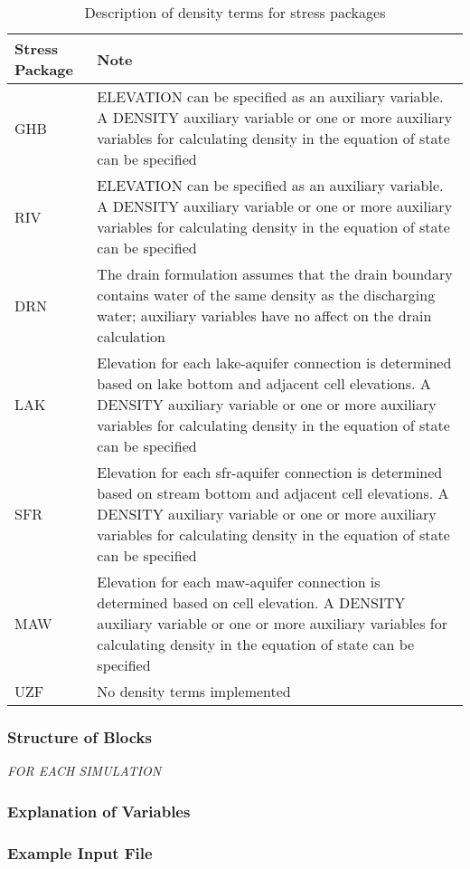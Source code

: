 \begin{longtable}{p{3cm} p{12cm}}
\caption{Description of density terms for stress packages}
\tabularnewline
\hline
\hline
\textbf{Stress Package} & \textbf{Note} \\
\hline
\endhead
\hline
\endfoot
GHB & ELEVATION can be specified as an auxiliary variable.  A DENSITY auxiliary variable or one or more auxiliary variables for calculating density in the equation of state can be specified \\
RIV & ELEVATION can be specified as an auxiliary variable.  A DENSITY auxiliary variable or one or more auxiliary variables for calculating density in the equation of state can be specified \\
DRN & The drain formulation assumes that the drain boundary contains water of the same density as the discharging water; auxiliary variables have no affect on the drain calculation  \\
LAK & Elevation for each lake-aquifer connection is determined based on lake bottom and adjacent cell elevations. A DENSITY auxiliary variable or one or more auxiliary variables for calculating density in the equation of state can be specified \\
SFR & Elevation for each sfr-aquifer connection is determined based on stream bottom and adjacent cell elevations. A DENSITY auxiliary variable or one or more auxiliary variables for calculating density in the equation of state can be specified \\
MAW & Elevation for each maw-aquifer connection is determined based on cell elevation. A DENSITY auxiliary variable or one or more auxiliary variables for calculating density in the equation of state can be specified \\
UZF & No density terms implemented \\
\end{longtable}

\vspace{5mm}
\subsubsection{Structure of Blocks}

\vspace{5mm}
\noindent \textit{FOR EACH SIMULATION}



%

\vspace{5mm}
\subsubsection{Explanation of Variables}
\begin{description}

\end{description}

\vspace{5mm}
\subsubsection{Example Input File}


